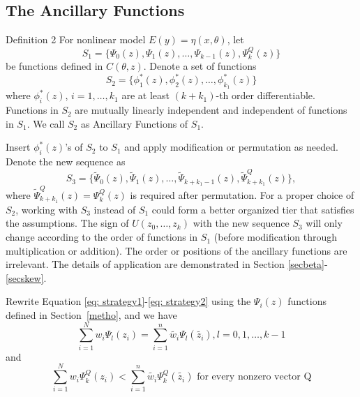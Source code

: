 \documentclass[12pt]{TD-CJS}
\begin{document}
\subsection{The Ancillary Functions} 
\begin{theorem}{Definition 2}{}\label{anci}
    For nonlinear model $E(y) = \eta(x,\theta)$, let \[S_1 = \{\Psi_0(z), \Psi_1(z), \ldots,\Psi_{k-1}(z) ,\Psi_k^Q(z)\}\] be functions defined in $C(\theta,z)$. Denote a set of functions \[ S_2 =\{\phi^*_1(z), \phi^*_2(z),\ldots, \phi^*_{k_1}(z)\}\] where $\phi^*_i(z)$, $i=1,\ldots,k_1$ are at least $(k+k_1)$-th order differentiable. Functions in $S_2$ are mutually linearly independent and independent of functions in $S_1$. We call $S_2$ as Ancillary Functions of $S_1$.
\end{theorem}

  Insert $\phi_i^*(z)$'s of $S_2$ to $S_1$ and apply modification or permutation as needed. Denote the new sequence as  \[S_3 = \{\tilde{\Psi}_0(z), \tilde{\Psi}_1(z), \ldots,\tilde{\Psi}_{k+k_1-1}(z), \tilde{\Psi}_{k+k_1}^Q(z)\},\]
  where $\tilde{\Psi}_{k+k_1}^Q(z) = \Psi_{k}^Q(z)$ is required after permutation. For a proper choice of $S_2$, working with $S_3$ instead of $S_1$ could form a better organized tier that satisfies the assumptions. The sign of $U(z_0,\ldots,z_k)$ with the new sequence $S_3$ will only change according to the order of functions in $S_1$ (before modification through multiplication or addition). The order or positions of the ancillary functions are irrelevant. The details of application are demonstrated in Section \ref{secbeta}-\ref{secskew}.


Rewrite Equation \eqref{eq: strategy1}-\eqref{eq: strategy2} using the $\Psi_i(z)$ functions defined in Section~\ref{metho}, and we have
\begin{equation} \label{eq: st1}
\sum_{i=1}^Nw_i\Psi_l(z_i)=\sum_{i=1}^n\tilde{w_i}\Psi_l(\tilde{z_i}), l=0,1,\ldots, k-1
\end{equation} and \begin{equation} \label{eq: st2}
\sum_{i=1}^Nw_i\Psi_k^Q(z_i)<\sum_{i=1}^n\tilde{w_i}\Psi_k^Q(\tilde{z_i}) \text{  for every nonzero vector Q}
\end{equation}  
\end{document}
